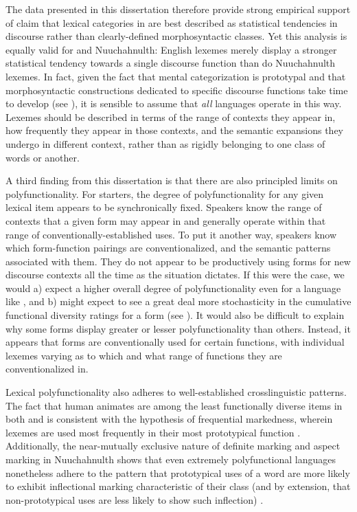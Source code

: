 The data presented in this dissertation therefore provide strong empirical support of  claim that lexical categories in  are best described as statistical tendencies in discourse rather than clearly-defined morphosyntactic classes. Yet this analysis is equally valid for  and Nuuchahnulth: English lexemes merely display a stronger statistical tendency towards a single discourse function than do Nuuchahnulth lexemes. In fact, given the fact that mental categorization is prototypal and that morphosyntactic constructions dedicated to specific discourse functions take time to develop (see ), it is sensible to assume that \emph{all} languages operate in this way. Lexemes should be described in terms of the range of contexts they appear in, how frequently they appear in those contexts, and the semantic expansions they undergo in different context, rather than as rigidly belonging to one class of words or another.

A third finding from this dissertation is that there are also principled limits on polyfunctionality. For starters, the degree of polyfunctionality for any given lexical item appears to be synchronically fixed. Speakers know the range of contexts that a given form may appear in and generally operate within that range of conventionally-established uses. To put it another way, speakers know which form-function pairings are conventionalized, and the semantic patterns associated with them. They do not appear to be productively using forms for new discourse contexts all the time as the situation dictates. If this were the case, we would a) expect a higher overall degree of polyfunctionality even for a language like , and b) might expect to see a great deal more stochasticity in the cumulative functional diversity ratings for a form (see ). It would also be difficult to explain why some forms display greater or lesser polyfunctionality than others. Instead, it appears that forms are conventionally used for certain functions, with individual lexemes varying as to which and what range of functions they are conventionalized in.

Lexical polyfunctionality also adheres to well-established crosslinguistic patterns. The fact that human animates are among the least functionally diverse items in both  and  is consistent with the hypothesis of frequential markedness, wherein lexemes are used most frequently in their most prototypical function \parencites{Croft1991}{Croft2000}{Croft2001b}{CroftLier2012}. Additionally, the near-mutually exclusive nature of definite marking and aspect marking in Nuuchahnulth shows that even extremely polyfunctional languages nonetheless adhere to the pattern that prototypical uses of a word are more likely to exhibit inflectional marking characteristic of their class (and by extension, that non-prototypical uses are less likely to show such inflection) \parencite{HopperThompson1984}.


